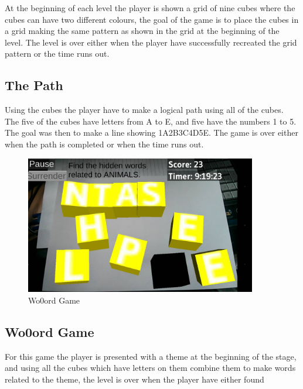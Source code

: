 At the beginning of each level the player is shown a grid of nine cubes where the cubes can have two different colours, the goal of the game is to place the cubes in a grid making the same pattern as shown in the grid at the beginning of the level. The level is over either when the player have successfully recreated the grid pattern or the time runs out.


\subsection{The Path}
	\label{game:the_path}

Using the cubes the player have to make a logical path using all of the cubes. The five of the cubes have letters from A to E, and five have the numbers 1 to 5. The goal was then to make a line showing 1A2B3C4D5E. The game is over either when the path is completed or when the time runs out.


\begin{figure}[h]
	\centering
	\begin{minipage}{.5\textwidth}
		\capstart
		\centering
		\vspace{10pt}
		\includegraphics[width=0.9\textwidth]{images/Wo0ords_screenshot.jpg}
		\vspace{-10pt}
		\caption{Wo0ord Game}
		\label{fig:Costas_wo0ords}
	\end{minipage}%
\end{figure}


\subsection{Wo0ord Game}
	\label{game:wo0ord_game}
	
For this game the player is presented with a theme at the beginning of the stage, and using all the cubes which have letters on them combine them to make words related to the theme, the level is over when the player have either found 